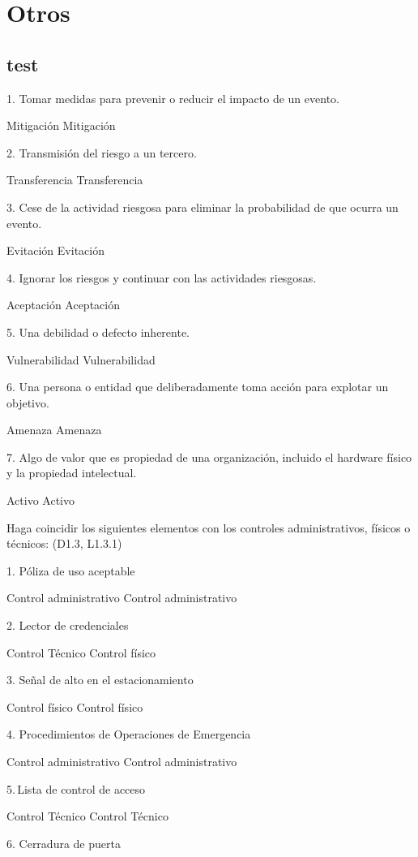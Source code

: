 \section{Otros}
 \subsection{test}
 1. Tomar medidas para prevenir o reducir el impacto de un evento.


Mitigación
   Mitigación

2. Transmisión del riesgo a un tercero.


Transferencia
   Transferencia

3. Cese de la actividad riesgosa para eliminar la probabilidad de que ocurra un evento.


Evitación
   Evitación

4. Ignorar los riesgos y continuar con las actividades riesgosas.


Aceptación
   Aceptación

5. Una debilidad o defecto inherente.


Vulnerabilidad
   Vulnerabilidad

6. Una persona o entidad que deliberadamente toma acción para explotar un objetivo.


Amenaza
   Amenaza

7. Algo de valor que es propiedad de una organización, incluido el hardware físico y la propiedad intelectual.


Activo
   Activo



Haga coincidir los siguientes elementos con los controles administrativos, físicos o técnicos: (D1.3, L1.3.1)

1. Póliza de uso aceptable


Control administrativo
   Control administrativo

2. Lector de credenciales


Control Técnico
   Control físico

3. Señal de alto en el estacionamiento


Control físico
   Control físico

4. Procedimientos de Operaciones de Emergencia


Control administrativo
   Control administrativo

5. Lista de control de acceso


Control Técnico
   Control Técnico

6. Cerradura de puerta


